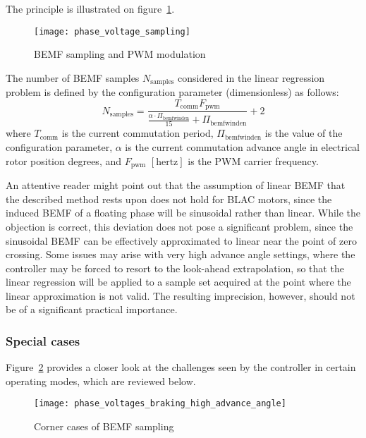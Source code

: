 \documentclass{zubaxdoc}
\begin{document}
The principle is illustrated on figure~\ref{phase_voltage_sampling}.

\begin{figure}[hbtp]
    \centering
    \texttt{[image: phase\_voltage\_sampling]}
    \caption{BEMF sampling and PWM modulation
    \label{phase_voltage_sampling}}
\end{figure}

The number of BEMF samples $N_\text{samples}$ considered in the linear regression problem is defined by
the configuration parameter  (dimensionless) as follows:
\begin{equation}
N_\text{samples} =
\frac{T_{\text{comm}} F_{\text{pwm}}}{\frac{\alpha\cdot{}\Pi_\text{bemfwinden}}{15} + \Pi_\text{bemfwinden}} + 2
\end{equation}
where $T_{\text{comm}}$ is the current commutation period,
$\Pi_\text{bemfwinden}$ is the value of the configuration parameter,
$\alpha$ is the current commutation advance angle in electrical rotor position degrees,
and $F_{\text{pwm}}$ $\left[\text{hertz}\right]$ is the PWM carrier frequency.

An attentive reader might point out that the assumption of linear BEMF that the described method rests
upon does not hold for BLAC motors, since the induced BEMF of a floating phase will be sinusoidal rather
than linear.
While the objection is correct, this deviation does not pose a significant problem, since the sinusoidal
BEMF can be effectively approximated to linear near the point of zero crossing.
Some issues may arise with very high advance angle settings, where the controller may be forced to resort to
the look-ahead extrapolation, so that the linear regression will be applied to a sample set acquired
at the point where the linear approximation is not valid.
The resulting imprecision, however, should not be of a significant practical importance.

\subsubsection{Special cases}

Figure~\ref{phase_voltage_sampling_corner_cases} provides a closer look at the challenges
seen by the controller in certain operating modes, which are reviewed below.

\begin{figure}[hbtp]
    \centering
    \texttt{[image: phase\_voltages\_braking\_high\_advance\_angle]}
    \caption{Corner cases of BEMF sampling
    \label{phase_voltage_sampling_corner_cases}}
\end{figure}
\end{document}
